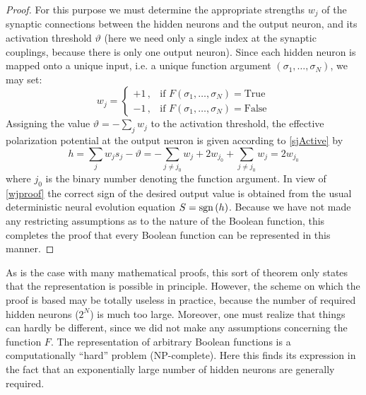 \begin{proof}
For this purpose we must determine the appropriate strengths $w_j$ of the synaptic connections between the hidden neurons and the output neuron, and its activation threshold $\vartheta$ (here we need only a single index at the synaptic couplings, because there is only one output neuron). Since each hidden neuron is mapped onto a unique input, i.e. a unique function argument $(\sigma_1,\ldots,\sigma_N)$, we may set:
\begin{equation}\label{wjproof}
w_{j}=\begin{cases}
+1\,,&\text{if $F(\sigma_1,\ldots,\sigma_N)=\text{True}$}\\
-1\,,&\text{if $F(\sigma_1,\ldots,\sigma_N)=\text{False}$}
\end{cases}
\end{equation}
Assigning the value $\vartheta=-\sum_{j}w_j$ to the activation threshold, the effective polarization potential at the output neuron is given according to \eqref{sjActive} by
\begin{equation}
h=\sum_jw_js_j-\vartheta=-\sum_{j\neq j_0}w_j+2w_{j_0}+\sum_{j\neq j_0}w_j=2w_{j_0}
\end{equation}
where $j_0$ is the binary number denoting the function argument. In view of \eqref{wjproof} the correct sign of the desired output value is obtained from the usual deterministic neural evolution equation $S=\operatorname{sgn}{(h)}$. Because we have not made any restricting assumptions as to the nature of the Boolean function, this completes the proof that every Boolean function can be represented in this manner.
\end{proof}
As is the case with many mathematical proofs, this sort of theorem only states that the representation is possible in principle. However, the scheme on which the proof is based may be totally useless in practice, because the number of required hidden neurons ($2^N$) is much too large. Moreover, one must realize that things can hardly be different, since we did not make any assumptions concerning the function $F$. The representation of arbitrary Boolean functions is a computationally ``hard'' problem (NP-complete). Here this finds its expression in the fact that an exponentially large number of hidden neurons are generally required.

